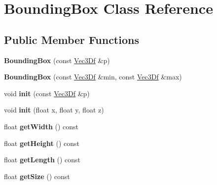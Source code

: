 \hypertarget{class_bounding_box}{
\section{BoundingBox Class Reference}
\label{class_bounding_box}
}
\subsection*{Public Member Functions}
\begin{DoxyCompactItemize}
\item 
\hypertarget{class_bounding_box_afcd5c43bf230a10f07e6552c58db967e}{
{\bfseries BoundingBox} (const \hyperlink{class_vec3_d}{Vec3Df} \&p)}
\label{class_bounding_box_afcd5c43bf230a10f07e6552c58db967e}

\item 
\hypertarget{class_bounding_box_a5f44381ea07c9b6f65bae79dada53ce5}{
{\bfseries BoundingBox} (const \hyperlink{class_vec3_d}{Vec3Df} \&min, const \hyperlink{class_vec3_d}{Vec3Df} \&max)}
\label{class_bounding_box_a5f44381ea07c9b6f65bae79dada53ce5}

\item 
\hypertarget{class_bounding_box_a0b1b7e15c6b98752179faa396e7896f1}{
void {\bfseries init} (const \hyperlink{class_vec3_d}{Vec3Df} \&p)}
\label{class_bounding_box_a0b1b7e15c6b98752179faa396e7896f1}

\item 
\hypertarget{class_bounding_box_abb26b742738d4081aafff2c5436bf226}{
void {\bfseries init} (float x, float y, float z)}
\label{class_bounding_box_abb26b742738d4081aafff2c5436bf226}

\item 
\hypertarget{class_bounding_box_acd3378928b8a9996790b22ad9f8b6404}{
float {\bfseries getWidth} () const }
\label{class_bounding_box_acd3378928b8a9996790b22ad9f8b6404}

\item 
\hypertarget{class_bounding_box_aeb0038310316513e738f712548394d45}{
float {\bfseries getHeight} () const }
\label{class_bounding_box_aeb0038310316513e738f712548394d45}

\item 
\hypertarget{class_bounding_box_a9551e31a1a85d1dcaff9951fb05223e2}{
float {\bfseries getLength} () const }
\label{class_bounding_box_a9551e31a1a85d1dcaff9951fb05223e2}

\item 
\hypertarget{class_bounding_box_a8a89e81934b64c21bc4b825b5d695f87}{
float {\bfseries getSize} () const }
\label{class_bounding_box_a8a89e81934b64c21bc4b825b5d695f87}


\end{DoxyCompactItemize}

